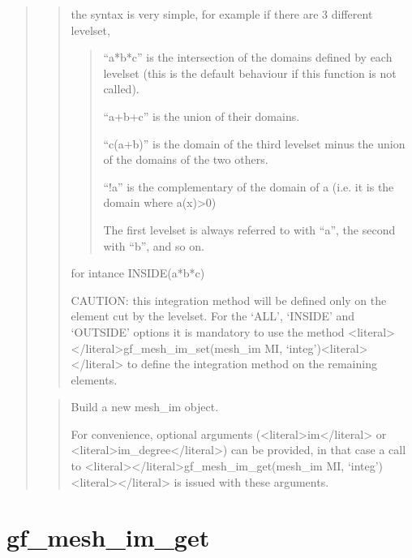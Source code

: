 \documentclass[a4paper,11pt,english]{sphinxmanual}
\begin{document}
\begin{quote}
\begin{quote}
\sphinxAtStartPar
the syntax is very simple, for example if there are 3 different
levelset,
\begin{quote}

\sphinxAtStartPar
“a*b*c” is the intersection of the domains defined by each
levelset (this is the default behaviour if this function is not
called).

\sphinxAtStartPar
“a+b+c” is the union of their domains.

\sphinxAtStartPar
“c\sphinxhyphen{}(a+b)” is the domain of the third levelset minus the union of
the domains of the two others.

\sphinxAtStartPar
“!a” is the complementary of the domain of a (i.e. it is the
domain where a(x)\textgreater{}0)

\sphinxAtStartPar
The first levelset is always referred to with “a”, the second
with “b”, and so on.
\end{quote}

\sphinxAtStartPar
for intance INSIDE(a*b*c)

\sphinxAtStartPar
CAUTION: this integration method will be defined only on the element
cut by the level\sphinxhyphen{}set. For the ‘ALL’, ‘INSIDE’ and ‘OUTSIDE’ options
it is mandatory to use the method \textless{}literal\textgreater{}\textless{}/literal\textgreater{}gf\_mesh\_im\_set(mesh\_im MI, ‘integ’)\textless{}literal\textgreater{}\textless{}/literal\textgreater{} to define
the integration method on the remaining elements.
\end{quote}

\sphinxAtStartPar
{}
\begin{quote}

\sphinxAtStartPar
Build a new mesh\_im object.

\sphinxAtStartPar
For convenience, optional arguments (\textless{}literal\textgreater{}im\textless{}/literal\textgreater{} or \textless{}literal\textgreater{}im\_degree\textless{}/literal\textgreater{}) can be
provided, in that case a call to \textless{}literal\textgreater{}\textless{}/literal\textgreater{}gf\_mesh\_im\_get(mesh\_im MI, ‘integ’)\textless{}literal\textgreater{}\textless{}/literal\textgreater{} is issued
with these arguments.
\end{quote}
\end{quote}


\section{gf\_mesh\_im\_get}
\label{\detokenize{scilab/cmdref_gf_mesh_im_get:gf-mesh-im-get}}\label{\detokenize{scilab/cmdref_gf_mesh_im_get::doc}}
\sphinxAtStartPar
{}
\end{document}
